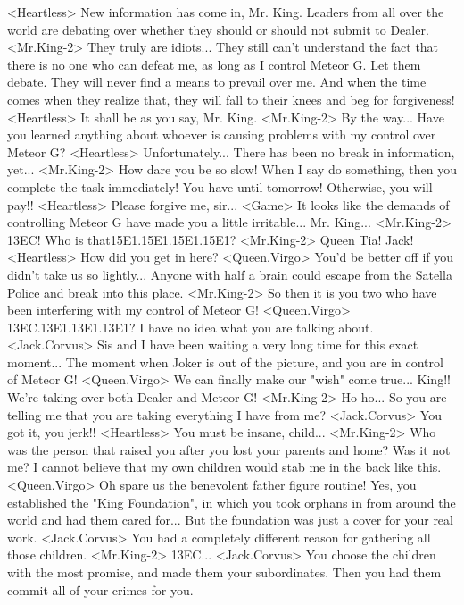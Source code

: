 <Heartless> New information has come in, Mr. King. 
Leaders from all over the world are debating over 
whether they should or should not submit to Dealer. 
<Mr.King-2> They truly are idiots... 
They still can't understand the fact that there is no 
one who can defeat me, as long as I control Meteor G. 
Let them debate. 
They will never find a means to prevail over me. 
And when the time comes when they realize that, they 
will fall to their knees and beg for forgiveness! 
<Heartless> It shall be as you say, Mr. King. 
<Mr.King-2> By the way... 
Have you learned anything about whoever is causing 
problems with my control over Meteor G? 
<Heartless> Unfortunately... There has been no break in information, yet... 
<Mr.King-2> How dare you be so slow! 
When I say do something, then you complete the task immediately! 
You have until tomorrow! Otherwise, you will pay!! 
<Heartless> Please forgive me, sir... 
<Game> It looks like the demands of controlling Meteor G have made you a little irritable... 
Mr. King... 
<Mr.King-2> {13}{EC}! 
Who is that{15}{E1}.{15}{E1}.{15}{E1}.{15}{E1}? 
<Mr.King-2> Queen Tia! Jack! 
<Heartless> How did you get in here? 
<Queen.Virgo> You'd be better off if you didn't take us so lightly... 
Anyone with half a brain could escape from the 
Satella Police and break into this place. 
<Mr.King-2> So then it is you two who have been interfering with my control of Meteor G! 
<Queen.Virgo> {13}{EC}.{13}{E1}.{13}{E1}.{13}{E1}? 
I have no idea what you are talking about. 
<Jack.Corvus> Sis and I have been waiting a very long time for this exact moment... 
The moment when Joker is out of the picture, and you are in control of Meteor G! 
<Queen.Virgo> We can finally make our "wish" come true... 
King!! 
We're taking over both Dealer and Meteor G! 
<Mr.King-2> Ho ho... 
So you are telling me that you are taking everything I have from me? 
<Jack.Corvus> You got it, you jerk!! 
<Heartless> You must be insane, child... 
<Mr.King-2> Who was the person that raised you after you lost your parents and home? 
Was it not me? 
I cannot believe that my own children would stab me in the back like this. 
<Queen.Virgo> Oh spare us the benevolent father figure routine! 
Yes, you established the "King Foundation", in which you took orphans in from 
around the world and had them cared for... 
But the foundation was just a cover for your real work. 
<Jack.Corvus> You had a completely different reason for gathering all those children. 
<Mr.King-2> {13}{EC}... 
<Jack.Corvus> You choose the children with the most promise, and made them your subordinates. 
Then you had them commit all of your crimes for you. 
